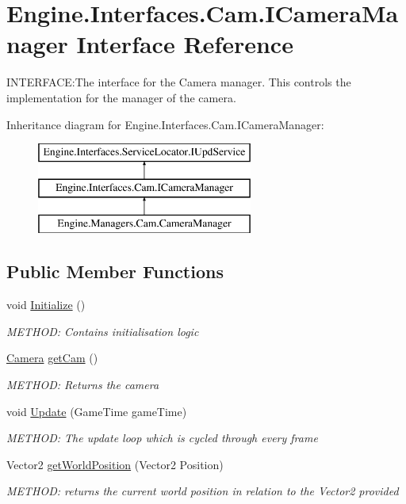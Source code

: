 \hypertarget{a00422}{}\section{Engine.\+Interfaces.\+Cam.\+I\+Camera\+Manager Interface Reference}
\label{a00422}


I\+N\+T\+E\+R\+F\+A\+CE\+:The interface for the Camera manager. This controls the implementation for the manager of the camera.  


Inheritance diagram for Engine.\+Interfaces.\+Cam.\+I\+Camera\+Manager\+:\begin{figure}[H]
\begin{center}
\leavevmode
\includegraphics[height=3.000000cm]{db/d43/a00422}
\end{center}
\end{figure}
\subsection*{Public Member Functions}
\begin{DoxyCompactItemize}
\item 
void \hyperlink{a00422_a21e0ce6b0ada068546161ecf02559912}{Initialize} ()
\begin{DoxyCompactList}\small\item\em M\+E\+T\+H\+OD\+: Contains initialisation logic \end{DoxyCompactList}\item 
\hyperlink{a00490}{Camera} \hyperlink{a00422_a91fc1dab51b36fd8955451ac00fd2819}{get\+Cam} ()
\begin{DoxyCompactList}\small\item\em M\+E\+T\+H\+OD\+: Returns the camera \end{DoxyCompactList}\item 
void \hyperlink{a00422_a78a46559249e70181100daff38ef5d6a}{Update} (Game\+Time game\+Time)
\begin{DoxyCompactList}\small\item\em M\+E\+T\+H\+OD\+: The update loop which is cycled through every frame \end{DoxyCompactList}\item 
Vector2 \hyperlink{a00422_a7d9fc1d792ddc3495bff23daac2a8d2a}{get\+World\+Position} (Vector2 Position)
\begin{DoxyCompactList}\small\item\em M\+E\+T\+H\+OD\+: returns the current world position in relation to the Vector2 provided \end{DoxyCompactList}\end{DoxyCompactItemize}


